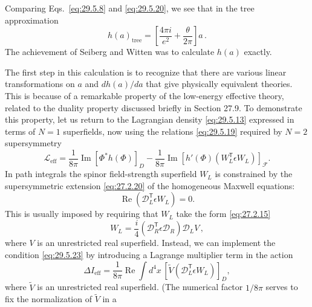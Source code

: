 Comparing Eqs.~\eqref{eq:29.5.8} and \eqref{eq:29.5.20}, we see that in the
tree approximation
\begin{equation}
  h(a)_{\mathrm{tree}}
  =\left[\frac{4\pi i}{e^2}+\frac{\theta}{2\pi}\right]a\,.
  \tag{29.5.21}\label{eq:29.5.21}
\end{equation}
The achievement of Seiberg and Witten was to calculate \(h(a)\) exactly.

The first step in this calculation is to recognize that there are various
linear transformations on \(a\) and \(dh(a)/da\) that give physically
equivalent theories. This is because of a remarkable property of the
low-energy effective theory, related to the duality property discussed
briefly in Section 27.9. To demonstrate this property, let us return to the
Lagrangian density \eqref{eq:29.5.13} expressed in terms of \(N=1\)
superfields, now using the relations \eqref{eq:29.5.19} required by \(N=2\)
supersymmetry
\begin{equation}
  \mathcal{L}_{\mathrm{eff}}
  =\frac{1}{8\pi}\operatorname{Im}\left[\Phi^*h(\Phi)\right]_D
  -\frac{1}{8\pi}\operatorname{Im}
    \left[h'(\Phi)\left(W_L^{\mathsf T}\epsilon W_L\right)\right]_{\mathcal F}.
  \tag{29.5.22}\label{eq:29.5.22}
\end{equation}
In path integrals the spinor field-strength superfield \(W_L\) is constrained
by the supersymmetric extension \eqref{eq:27.2.20} of the homogeneous Maxwell
equations:
\begin{equation}
  \operatorname{Re}\left(\mathcal{D}_L^{\mathsf T}\epsilon W_L\right)=0.
  \tag{29.5.23}\label{eq:29.5.23}
\end{equation}
This is usually imposed by requiring that \(W_L\) take the form
\eqref{eq:27.2.15}
\begin{equation}
  W_L=\frac{i}{4}
  \left(\mathcal{D}_R^{\mathsf T}\epsilon\mathcal{D}_R\right)
  \mathcal{D}_LV\,,
  \tag{29.5.24}\label{eq:29.5.24}
\end{equation}
where \(V\) is an unrestricted real superfield. Instead, we can implement
the condition \eqref{eq:29.5.23} by introducing a Lagrange multiplier term
in the action
\begin{equation}
  \Delta I_{\mathrm{eff}}
  =\frac{1}{8\pi}\operatorname{Re}\int d^4x\,
    \left[
      \widetilde V
      \left(\mathcal{D}_L^{\mathsf T}\epsilon W_L\right)
    \right]_D,
  \tag{29.5.25}\label{eq:29.5.25}
\end{equation}
where \(\widetilde V\) is an unrestricted real superfield. (The numerical
factor \(1/8\pi\) serves to fix the normalization of \(\widetilde V\) in a
